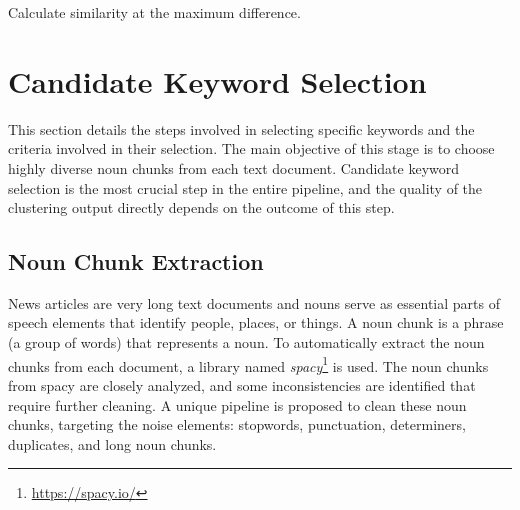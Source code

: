  
 \begin{algorithm}[H]
 	\DontPrintSemicolon
 	
 	
 	
 	
 	\caption{Calculate similarity at the maximum difference.} \label{algo:max_diff}
 \end{algorithm}

\section{Candidate Keyword Selection}

This section details the steps involved in selecting specific keywords and the criteria involved
in their selection. The main objective of this stage is to choose highly diverse noun chunks from each
text document. Candidate keyword selection is the most crucial step in the entire pipeline, and the
quality of the clustering output directly depends on the outcome of this step.

\subsection{Noun Chunk Extraction}

News articles are very long text documents and nouns serve as essential parts of speech elements that identify people, places, or things. A noun chunk is a phrase (a group of words) that represents a noun. To automatically extract the noun chunks from each document, a library named \emph{spacy}\footnote{\url{https://spacy.io/}} is used. The noun chunks from spacy are closely analyzed, and some inconsistencies are identified that require further cleaning. A unique pipeline is proposed to clean these noun chunks, targeting the noise elements: stopwords, punctuation, determiners, duplicates, and long noun chunks.

